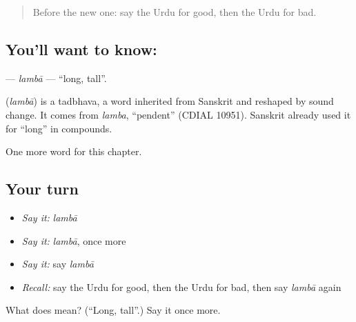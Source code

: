 \label{lesson:UR-C70-lamba}



\begin{quote}
Before the new one: say the Urdu for good, then the Urdu for bad.
\end{quote}

\subsection*{You'll want to know: }
\textbf{} — \emph{lambā} — \textquotedblleft{}long, tall\textquotedblright{}.

\begin{cousinweb}
\textbf{} (\emph{lambā}) is a tadbhava, a word inherited from Sanskrit and reshaped by sound change. It comes from \emph{lamba}, \textquotedblleft{}pendent\textquotedblright{} (CDIAL 10951). Sanskrit already used it for \textquotedblleft{}long\textquotedblright{} in compounds.
\end{cousinweb}

\begin{grammarlens}[title={What you've built}]
One more word for this chapter.
\end{grammarlens}

\subsection*{Your turn}
\begin{itemize}
\raggedright
  \item \emph{Say it:} \emph{lambā}
  \item \emph{Say it:} \emph{lambā}, once more
  \item \emph{Say it:} say \emph{lambā}
  \item \emph{Recall:} say the Urdu for good, then the Urdu for bad, then say \emph{lambā} again
\end{itemize}

\begin{tcolorbox}[breakable,colback=teal!4,colframe=teal!35!black,title={Before you move on}]
What does  mean? (\textquotedblleft{}Long, tall\textquotedblright{}.) Say it once more.
\end{tcolorbox}
